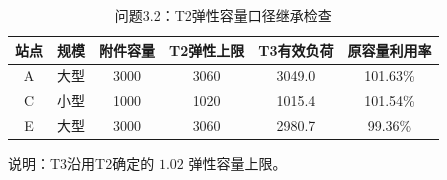 \begin{table}[h]
\centering
\caption{问题3.2：T2弹性容量口径继承检查}
\begin{tabular}{|c|c|c|c|c|c|}
\hline
站点 & 规模 & 附件容量 & T2弹性上限 & T3有效负荷 & 原容量利用率 \\
\hline
A & 大型 & 3000 & 3060 & 3049.0 & 101.63\% \\
C & 小型 & 1000 & 1020 & 1015.4 & 101.54\% \\
E & 大型 & 3000 & 3060 & 2980.7 & 99.36\% \\
\hline
\end{tabular}
\vspace{0.2cm}
说明：T3沿用T2确定的 $1.02$ 弹性容量上限。
\end{table}